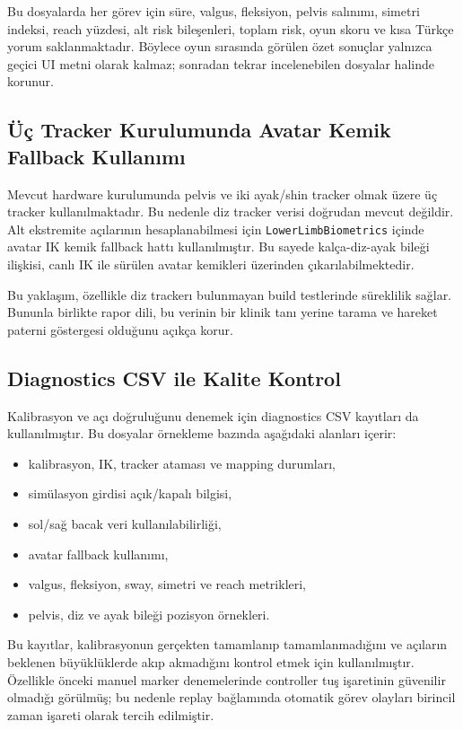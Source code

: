 \documentclass[11pt,a4paper]{article}
\begin{document}
Bu dosyalarda her görev için süre, valgus, fleksiyon, pelvis salınımı,
simetri indeksi, reach yüzdesi, alt risk bileşenleri, toplam risk, oyun skoru
ve kısa Türkçe yorum saklanmaktadır. Böylece oyun sırasında görülen özet
sonuçlar yalnızca geçici UI metni olarak kalmaz; sonradan tekrar incelenebilen
dosyalar halinde korunur.

\subsection{Üç Tracker Kurulumunda Avatar Kemik Fallback Kullanımı}

Mevcut hardware kurulumunda pelvis ve iki ayak/shin tracker olmak üzere üç
tracker kullanılmaktadır. Bu nedenle diz tracker verisi doğrudan mevcut
değildir. Alt ekstremite açılarının hesaplanabilmesi için
\texttt{LowerLimbBiometrics} içinde avatar IK kemik fallback hattı
kullanılmıştır. Bu sayede kalça-diz-ayak bileği ilişkisi, canlı IK ile sürülen
avatar kemikleri üzerinden çıkarılabilmektedir.

Bu yaklaşım, özellikle diz trackerı bulunmayan build testlerinde süreklilik
sağlar. Bununla birlikte rapor dili, bu verinin bir klinik tanı yerine
tarama ve hareket paterni göstergesi olduğunu açıkça korur.

\subsection{Diagnostics CSV ile Kalite Kontrol}

Kalibrasyon ve açı doğruluğunu denemek için diagnostics CSV kayıtları da
kullanılmıştır. Bu dosyalar örnekleme bazında aşağıdaki alanları içerir:

\begin{itemize}[nosep]
    \item kalibrasyon, IK, tracker ataması ve mapping durumları,
    \item simülasyon girdisi açık/kapalı bilgisi,
    \item sol/sağ bacak veri kullanılabilirliği,
    \item avatar fallback kullanımı,
    \item valgus, fleksiyon, sway, simetri ve reach metrikleri,
    \item pelvis, diz ve ayak bileği pozisyon örnekleri.
\end{itemize}

Bu kayıtlar, kalibrasyonun gerçekten tamamlanıp tamamlanmadığını ve açıların
beklenen büyüklüklerde akıp akmadığını kontrol etmek için kullanılmıştır.
Özellikle önceki manuel marker denemelerinde controller tuş işaretinin güvenilir
olmadığı görülmüş; bu nedenle replay bağlamında otomatik görev olayları
birincil zaman işareti olarak tercih edilmiştir.
\end{document}
